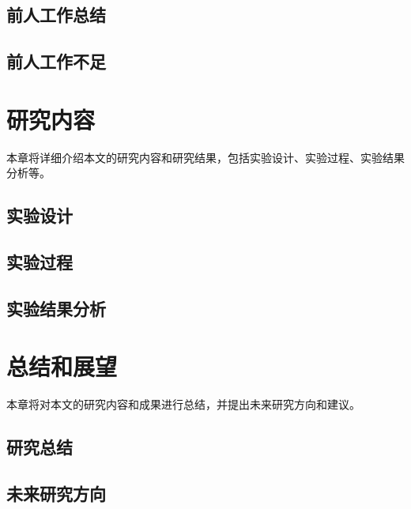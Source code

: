 \documentclass[
    writingLanguage=chinese,
    addPageTitle=yes,
    AddDeclaration=yes,
    addMUSTlog=no,
    refUnindent=yes,
    printing=no,
]{.def/must}
\begin{document}
\subsection{前人工作总结}

\txtHere[4]

\subsection{前人工作不足}

\txtHere[5]

\section{研究内容}

本章将详细介绍本文的研究内容和研究结果，包括实验设计、实验过程、实验结果分析等。

\subsection{实验设计}

\txtHere[6]

\subsection{实验过程}

\txtHere[7]

\subsection{实验结果分析}

\txtHere[8]

\section{总结和展望}

本章将对本文的研究内容和成果进行总结，并提出未来研究方向和建议。

\subsection{研究总结}

\txtHere[9]

\subsection{未来研究方向}

\txtHere[10]
\end{document}
